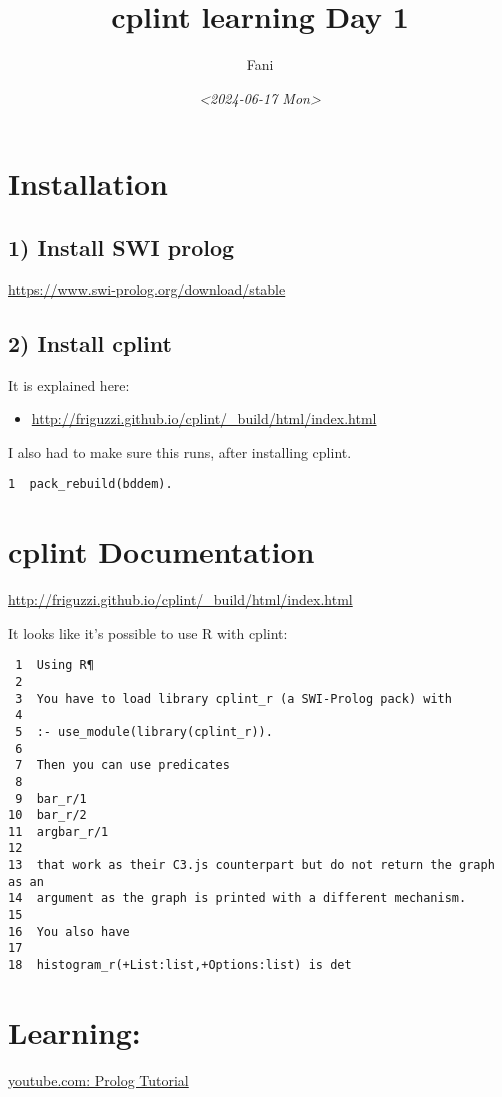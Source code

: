 \documentclass[11pt]{article}
\author{Fani}
\date{\textit{<2024-06-17 Mon>}}
\title{cplint learning Day 1}
\begin{document}
\maketitle

\section{Installation}
\label{sec:org1c6a3a8}
\subsection{1) Install SWI prolog}
\label{sec:orgda88be5}
\url{https://www.swi-prolog.org/download/stable}

\subsection{2) Install cplint}
\label{sec:orgda26047}
It is explained here:
\begin{itemize}
\item \url{http://friguzzi.github.io/cplint/\_build/html/index.html}
\end{itemize}

I also had to make sure this runs, after installing cplint.

\begin{verbatim}
1  pack_rebuild(bddem).
\end{verbatim}

\section{cplint Documentation}
\label{sec:org2149c82}
\url{http://friguzzi.github.io/cplint/\_build/html/index.html}

It looks like it's possible to use R with cplint:

\begin{verbatim}
 1  Using R¶
 2  
 3  You have to load library cplint_r (a SWI-Prolog pack) with
 4  
 5  :- use_module(library(cplint_r)).
 6  
 7  Then you can use predicates
 8  
 9  bar_r/1
10  bar_r/2
11  argbar_r/1
12  
13  that work as their C3.js counterpart but do not return the graph as an
14  argument as the graph is printed with a different mechanism.
15  
16  You also have
17  
18  histogram_r(+List:list,+Options:list) is det
\end{verbatim}

\section{Learning:}
\label{sec:orgee7a71a}
\href{https://www.youtube.com/watch?v=SykxWpFwMGs\&pp=ygUSZGVyZWsgYmFuYXMgcHJvbG9n}{youtube.com: Prolog Tutorial}
\end{document}
